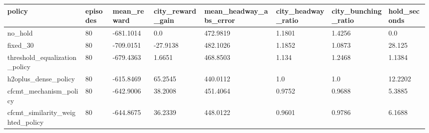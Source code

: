 \begin{tabular}{llllllll}
\toprule
policy & episodes & mean\_reward & city\_reward\_gain & mean\_headway\_abs\_error & city\_headway\_ratio & city\_bunching\_ratio & hold\_seconds \\
\midrule
no\_hold & 80 & -681.1014 & 0.0 & 472.9819 & 1.1801 & 1.4256 & 0.0 \\
fixed\_30 & 80 & -709.0151 & -27.9138 & 482.1026 & 1.1852 & 1.0873 & 28.125 \\
threshold\_equalization\_policy & 80 & -679.4363 & 1.6651 & 468.8503 & 1.134 & 1.2468 & 1.1384 \\
h2oplus\_dense\_policy & 80 & -615.8469 & 65.2545 & 440.0112 & 1.0 & 1.0 & 12.2202 \\
cfcmt\_mechanism\_policy & 80 & -642.9006 & 38.2008 & 451.4064 & 0.9752 & 0.9688 & 5.3885 \\
cfcmt\_similarity\_weighted\_policy & 80 & -644.8675 & 36.2339 & 448.0122 & 0.9601 & 0.9786 & 6.1688 \\
\bottomrule
\end{tabular}
